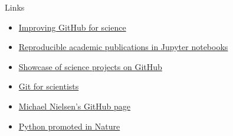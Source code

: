 \documentclass[compress,red]{beamer}\usetheme{Warsaw}\useoutertheme[subsection=false]{smoothbars}
\begin{document}
\begin{frame}{Links}
\begin{itemize}
\item \href{https://github.com/blog/1840-improving-github-for-science}{Improving GitHub for science}

\item \href{https://github.com/ipython/ipython/wiki/A-gallery-of-interesting-IPython-Notebooks\#reproducible-academic-publications}{Reproducible academic publications in Jupyter notebooks}

\item \href{https://github.com/showcases/science}{Showcase of science projects on GitHub}

\item \href{http://nyuccl.org/pages/gittutorial/}{Git for scientists}

\item \href{https://github.com/mnielsen}{Michael Nielsen's GitHub page}

\item \href{http://www.nature.com/news/programming-pick-up-python-1.16833}{Python promoted in Nature}
\end{itemize}
\end{frame}
\end{document}
